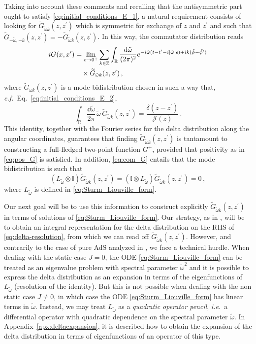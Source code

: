 \documentclass[aps, prd, amsmath, floats, floatfix, twocolumn, nofootinbib, superscriptaddress, showpacs]{revtex4-1}
\def\bR{{\mathbb R}}
\def\tomega{{\tilde{\omega}}}
\begin{document}
Taking into account these comments and recalling that the antisymmetric part ought to satisfy \eqref{eq:initial_conditions_E_1}, a natural requirement consists of looking for $\widetilde{G}_{\tilde{\omega} k}(z,z^\prime)$ which is symmetric for exchange of $z$ and $z^\prime$ and such that $\widetilde{G}_{-\tilde{\omega},-k}(z,z^\prime) = -\widetilde{G}_{\tilde{\omega} k}(z,z^\prime)$. In this way, the commutator distribution reads
%
\begin{align}
i G(x,x^\prime) &= \lim_{\epsilon \to 0^+} \sum\limits_{k\in\mathbb{Z}} \int_\bR \frac{\dd\tilde{\omega}}{(2\pi)^2} e^{-i\tilde{\omega} (t-t^\prime-i|\tomega|\epsilon) + ik(\tilde{\phi}-\tilde{\phi^\prime})} \notag \\
&\quad \times  \widetilde{G}_{\tilde{\omega} k}(z,z^\prime) \, , \label{eq:propagator_modes}
\end{align}
%
where $\widetilde{G}_{\omega k}(z,z^\prime)$ is a mode bidistribution chosen in such a way that, \textit{c.f.}~Eq.~\eqref{eq:initial_conditions_E_2},
%
\begin{equation} \label{eq:delta-resolution}
\int_\bR \frac{\dd\tilde{\omega}}{2\pi} \, \tilde{\omega} \, \widetilde{G}_{\tilde{\omega} k}(z,z^\prime) = \frac{\delta(z-z^\prime)}{\mathcal{J}(z)} \, .
\end{equation}
%
This identity, together with the Fourier series for the delta distribution along the angular coordinates, guarantees that finding $\widetilde{G}_{\tilde{\omega} k}(z,z^\prime)$ is tantamount to constructing a full-fledged two-point function $G^+$, provided that positivity as in \eqref{eq:pos_G} is satisfied. In addition, \eqref{eq:eom_G} entails that the mode bidistribution is such that
$$(L_\tomega\otimes\mathbb{I})\widetilde{G}_{\tilde{\omega} k}(z,z^\prime)=(\mathbb{I}\otimes L_\tomega)\widetilde{G}_{\tilde{\omega} k}(z,z^\prime)=0 \, ,$$
where $L_\tomega$ is defined in \eqref{eq:Sturm_Liouville_form}. 

Our next goal will be to use this information to construct explicitly $\widetilde{G}_{\tomega k}(z,z^\prime)$ in terms of solutions of \eqref{eq:Sturm_Liouville_form}. Our strategy, as in \cite{Dappiaggi:2016fwc}, will be to obtain an integral representation for the delta distribution on the RHS of \eqref{eq:delta-resolution}, from which we can read off $\widetilde{G}_{\tilde{\omega} k}(z,z^\prime)$. However, and contrarily to the case of pure AdS analyzed in \cite{Dappiaggi:2016fwc}, we face a technical hurdle. When dealing with the static case $J=0$, the ODE \eqref{eq:Sturm_Liouville_form} can be treated as an eigenvalue problem with spectral parameter $\tilde{\omega}^2$ and it is possible to express the delta distribution as an expansion in terms of the eigenfunctions of $L_\tomega$ (resolution of the identity). But this is not possible when dealing with the non static case $J \neq 0$, in which case the ODE \eqref{eq:Sturm_Liouville_form} has linear terms in $\tilde{\omega}$. Instead, we may treat $L_\tomega$ as a \emph{quadratic operator pencil}, \emph{i.e.}~a differential operator with quadratic dependence on the spectral parameter $\tilde{\omega}$. In Appendix~\ref{apx:deltaexpansion}, it is described how to obtain the expansion of the delta distribution in terms of eigenfunctions of an operator of this type.
\end{document}
